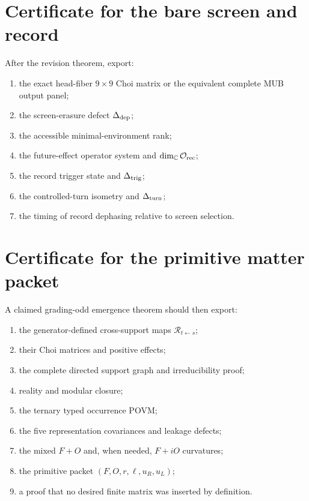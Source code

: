 \documentclass[11pt,oneside,openany]{book}
\numberwithin{equation}{chapter}
\theoremstyle{definition}
\theoremstyle{remark}
\newcommand{\C}{\mathbb C}
\begin{document}
\section{Certificate for the bare screen and record}

After the revision theorem, export:

\begin{enumerate}[label=\textup{(S\arabic*)},leftmargin=2.7em]
\item the exact head-fiber \(9\times9\) Choi matrix or the equivalent complete
      MUB output panel;
\item the screen-erasure defect \(\Delta_{\rm dep}\);
\item the accessible minimal-environment rank;
\item the future-effect operator system and
      \(\dim_\C\mathcal O_{\rm rec}\);
\item the record trigger state and \(\Delta_{\rm trig}\);
\item the controlled-turn isometry and \(\Delta_{\rm turn}\);
\item the timing of record dephasing relative to screen selection.
\end{enumerate}

\section{Certificate for the primitive matter packet}

A claimed grading-odd emergence theorem should then export:

\begin{enumerate}[label=\textup{(M\arabic*)},leftmargin=2.7em]
\item the generator-defined cross-support maps
      \(\mathcal R_{t\leftarrow s}\);
\item their Choi matrices and positive effects;
\item the complete directed support graph and irreducibility proof;
\item reality and modular closure;
\item the ternary typed occurrence POVM;
\item the five representation covariances and leakage defects;
\item the mixed \(F+O\) and, when needed, \(F+iO\) curvatures;
\item the primitive packet \((F,O,r,\ell,u_R,u_L)\);
\item a proof that no desired finite matrix was inserted by definition.
\end{enumerate}
\end{document}
